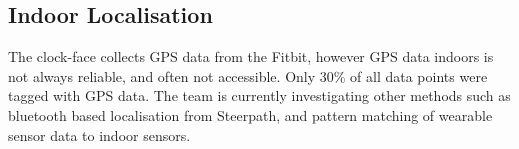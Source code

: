 










\subsection{Indoor Localisation}
\label{ch:localisation}

The clock-face collects GPS data from the Fitbit, however GPS data indoors is not always reliable, and often not accessible. Only 30\% of all data points were tagged with GPS data. The team is currently investigating other methods such as bluetooth based localisation from Steerpath, and pattern matching of wearable sensor data to indoor sensors.

